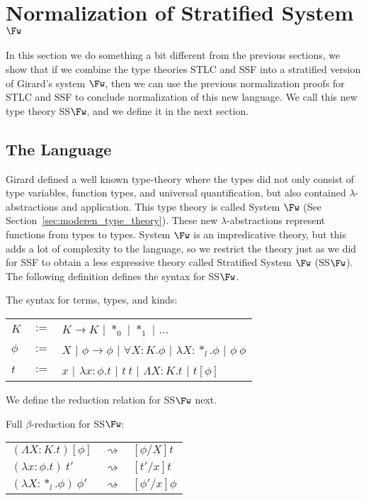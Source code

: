 \section{Normalization of Stratified System $\Fw$}
\label{subsec:normalization_stratified_system_fw}
In this section we do something a bit different from the previous
sections, we show that if we combine the type theories STLC and SSF
into a stratified version of Girard's system $\Fw$, then we can use
the previous normalization proofs for STLC and SSF to conclude
normalization of this new language.  We call this new type theory
SS$\Fw$, and we define it in the next section.

\subsection{The Language}
\label{subsec:the_language}
Girard defined a well known type-theory where the types did not only
consist of type variables, function types, and universal
quantification, but also contained $\lambda$-abstractions and
application.  This type theory is called System $\Fw$
\cite{barendregt92} (See Section~\ref{sec:moderen_type_theory}). These
new $\lambda$-abstractions represent functions from types to types.
System $\Fw$ is an impredicative theory, but this adds a lot of
complexity to the language, so we restrict the theory just as we did
for SSF to obtain a less expressive theory called Stratified System
$\Fw$ (SS$\Fw$). The following definition defines the syntax for
SS$\Fw$.
\begin{definition}
  \label{def:syntax_ssfw}
  The syntax for terms, types, and kinds:
  \begin{center}
    \begin{tabular}{lll}
      $K$ & $:=$ & $K \to K$ $|$ $*_0$ $|$ $*_1$ $|$ $\ldots$\\
      $\phi$ & $:=$ & $X$   $|$ $\phi \rightarrow \phi$ $|$ $\forall X:K.\phi$ $|$ $\lambda X:*_l.\phi$ $|$ $\phi\ \phi$\\
      $t$ & $:=$ & $x$   $|$ $\lambda x:\phi.t$   $|$ $t\ t$ $|$ $\Lambda X:K.t$ $|$ $t[\phi]$\\
    \end{tabular}
  \end{center}
\end{definition}
\noindent We define the reduction relation for SS$\Fw$ next.
\begin{definition}
  \label{def:reduction_rules_ssf}
  Full $\beta$-reduction for SS$\Fw$:
  \begin{center}
    \begin{tabular}{lll}
      $(\Lambda X:K.t)[\phi]$     & $\rightsquigarrow$ & $[\phi/X]t$\\
      $(\lambda x:\phi.t)\ t'$      & $\rightsquigarrow$ & $[t'/x]t$\\
      $(\lambda X:*_l.\phi)\ \phi'$ & $\rightsquigarrow$ & $[\phi'/x]\phi$
    \end{tabular}
  \end{center}
\end{definition}

